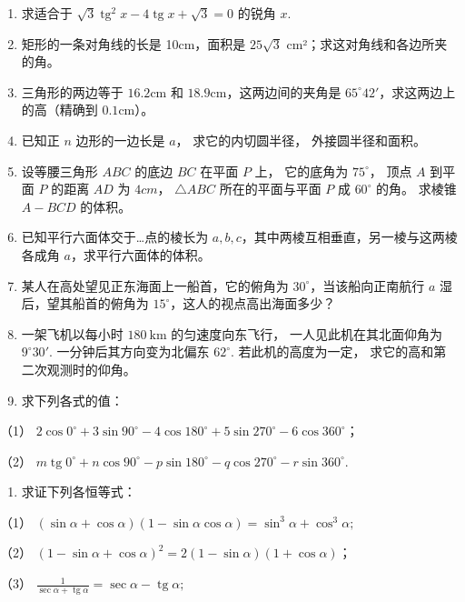 \begin{enumerate}[start=2]
\item
  求适合于
  \(\sqrt{3} \operatorname{tg}^2 x - 4 \operatorname{tg} x + \sqrt{3} = 0\)
  的锐角 \(x\).
\item
  矩形的一条对角线的长是 10cm，面积是 \(25\sqrt{3}\)
  cm²；求这对角线和各边所夹的角。
\item
  三角形的两边等于 \(16.2\mathrm{cm}\) 和
  \(18.9\mathrm{cm}\)，这两边间的夹角是
  \(65^{\circ}42'\)，求这两边上的高（精确到 \(0.1\mathrm{cm}\)）。
\item
  已知正 \(n\) 边形的一边长是 \(a\)， 求它的内切圆半径，
  外接圆半径和面积。
\item
  设等腰三角形 \(ABC\) 的底边 \(BC\) 在平面 \(P\) 上， 它的底角为
  \(75^{\circ}\)， 顶点 \(A\) 到平面 \(P\) 的距离 \(AD\) 为 \(4cm\)，
  \(\triangle ABC\) 所在的平面与平面 \(P\) 成 \(60^{\circ}\) 的角。
  求棱锥 \(A-BCD\) 的体积。
\item
  已知平行六面体交于\ldots 点的棱长为
  \(a, b, c\)，其中两棱互相垂直，另一棱与这两棱各成角
  \(a\)，求平行六面体的体积。
\item
  某人在高处望见正东海面上一船首，它的俯角为
  \(30^{\circ}\)，当该船向正南航行 \(a\) 湿后，望其船首的俯角为
  \(15^{\circ}\)，这人的视点高出海面多少？
\item
  一架飞机以每小时 \(180 \mathrm{~km}\) 的匀速度向东飞行，
  一人见此机在其北面仰角为 \(9^{\circ}30'\). 一分钟后其方向变为北偏东
  \(62^{\circ}\). 若此机的高度为一定， 求它的高和第二次观测时的仰角。
\item
  求下列各式的值：
\end{enumerate}

（1）
\(2\cos 0^{\circ} + 3\sin 90^{\circ} - 4\cos 180^{\circ} + 5\sin 270^{\circ} - 6\cos 360^{\circ}\)；

（2）
\(m \operatorname{tg} 0^{\circ} + n \cos 90^{\circ} - p \sin 180^{\circ} - q \cos 270^{\circ} - r \sin 360^{\circ}\).

\begin{enumerate}[start=11]
\item
  求证下列各恒等式：
\end{enumerate}

（1）
\((\sin \alpha + \cos \alpha)(1 - \sin \alpha \cos \alpha) = \sin^3 \alpha + \cos^3 \alpha;\)

（2）
\((1 - \sin \alpha + \cos \alpha)^2 = 2(1 - \sin \alpha)(1 + \cos \alpha)\)；

（3）
\(\frac{1}{\sec \alpha + \operatorname{tg} \alpha} = \sec \alpha - \operatorname{tg} \alpha;\)

